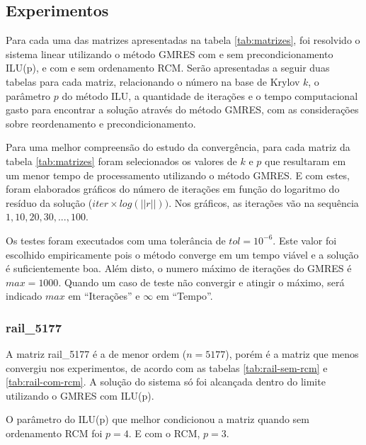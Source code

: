 \documentclass[
	11pt,				%
	oneside,			%
	a4paper,			%
	english,			%
	brazil,				%
	]{article}
\begin{document}
\subsection{Experimentos}
Para cada uma das matrizes apresentadas na tabela \ref{tab:matrizes}, foi resolvido o sistema linear utilizando o método GMRES com e sem precondicionamento ILU(p), e com e sem ordenamento RCM. Serão apresentadas a seguir duas tabelas para cada matriz, relacionando o número na base de Krylov $k$, o parâmetro $p$ do método ILU, a quantidade de iterações e o tempo computacional gasto para encontrar a solução através do método GMRES, com as considerações sobre reordenamento e precondicionamento.

Para uma melhor compreensão do estudo da convergência, para cada matriz da tabela \ref{tab:matrizes} foram selecionados os valores de $k$ e $p$ que resultaram em um menor tempo de processamento utilizando o método GMRES. E com estes, foram elaborados gráficos do número de iterações em função do logaritmo do resíduo da solução ($iter \times log(||r||))$. Nos gráficos, as iterações vão na sequência $1, 10, 20, 30, ..., 100$.

Os testes foram executados com uma tolerância de $tol = 10^{-6}$. Este valor foi escolhido empiricamente pois o método converge em um tempo viável e a solução é suficientemente boa. Além disto, o numero máximo de iterações do GMRES é $max = 1000$. Quando um caso de teste não convergir e atingir o máximo, será indicado $max$ em ``Iterações'' e $\infty$ em ``Tempo''.

\subsubsection{rail\_5177} \label{sec:rail}
A matriz rail\_5177 é a de menor ordem ($n = 5177$), porém é a matriz que menos convergiu nos experimentos, de acordo com as tabelas \ref{tab:rail-sem-rcm} e \ref{tab:rail-com-rcm}. A solução do sistema só foi alcançada dentro do limite utilizando o GMRES com ILU(p).

O parâmetro do ILU(p) que melhor condicionou a matriz quando sem ordenamento RCM foi $p = 4$. E com o RCM, $p = 3$.
\end{document}
